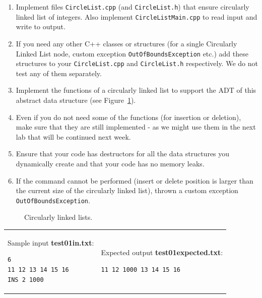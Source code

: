 \documentclass[11pt]{article}
\begin{document}
\begin{enumerate}
\item Implement files {\tt CircleList.cpp} (and {\tt CircleList.h})
that ensure circularly linked list of integers. 
Also implement {\tt CircleListMain.cpp} to read input and write to 
output. 
\item If you need any other C++ classes or structures (for a single 
Circularly Linked List node, custom exception {\tt OutOfBoundsException}
etc.) add these structures to 
your {\tt CircleList.cpp} and {\tt CircleList.h} respectively. 
We do not test any of them separately. 
\item Implement the functions of a circularly linked list to support 
the ADT of this abstract data structure (see Figure~\ref{fig:ex05-circularly-linked-lists}).
\item Even if you do not need some of the functions (for insertion or 
deletion), make sure that they are still implemented - as we might use them 
in the next lab that will be continued next week. 
\item Ensure that your code has destructors for all the data 
structures you dynamically create and that your code has no memory leaks.
\item If the command cannot be performed (insert or delete 
position is larger than the current size of the circularly linked list), 
thrown a custom exception {\tt OutOfBoundsException}.
\end{enumerate}

\begin{figure}[!htb]
\caption{\label{fig:ex05-circularly-linked-lists} Circularly linked lists.}
\end{figure}


\vspace{10pt}
\begin{tabular}{@{}ll@{}}
\begin{minipage}[t]{0.49\columnwidth}
Sample input {\bf test01in.txt}:
\begin{verbatim}
6
11 12 13 14 15 16
INS 2 1000
\end{verbatim}
\end{minipage} 
&
\begin{minipage}[t]{0.49\columnwidth}
Expected output {\bf test01expected.txt}:
\begin{verbatim}
11 12 1000 13 14 15 16
\end{verbatim}
\end{minipage} 
\end{tabular}
\end{document}
